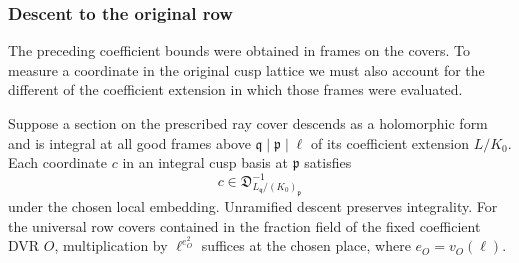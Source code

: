 \subsubsection*{Descent to the original row}
\label{subsec:theta-cover-descent}

The preceding coefficient bounds were obtained in frames on the covers. To measure a coordinate in the original cusp lattice we must also account for the different of the coefficient extension in which those frames were evaluated.

\begin{proposition}\label{prop:ray-cover-descent}
Suppose a section on the prescribed ray cover descends as a
holomorphic form and is integral at all good frames above
\(\mathfrak q\mid\mathfrak p\mid\ell\) of its coefficient
extension \(L/K_0\). Each coordinate \(c\) in an integral cusp basis at \(\mathfrak p\) satisfies
\[
 c\in\mathfrak D_{L_{\mathfrak q}/(K_0)_{\mathfrak p}}^{-1}
\]
under the chosen local embedding.
Unramified descent preserves integrality. For the universal row
covers contained in the fraction field of the fixed coefficient
DVR \(O\), multiplication by \(\ell^{e_O^2}\) suffices at the
chosen place, where \(e_O=v_O(\ell)\).
\end{proposition}

